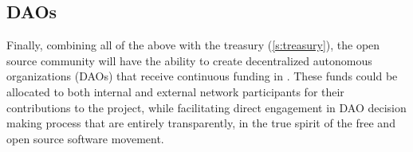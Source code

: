 \subsection{DAOs}
Finally, combining all of the above with the \oscoin{} treasury
(\ref{s:treasury}), the open source community will have the ability to create decentralized
autonomous organizations (DAOs) that receive continuous funding in \oscoin{}.
These funds could be allocated to both internal and external network
participants for their contributions to the project, while facilitating direct engagement
in DAO decision making process that are entirely transparently, in the
true spirit of the free and open source software movement.

